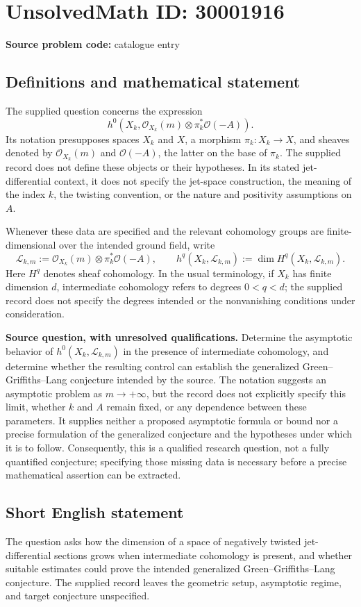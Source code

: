 \documentclass[11pt]{article}
\begin{document}
\section*{UnsolvedMath ID: 30001916}
\textbf{Source problem code:} catalogue entry
\subsection{Definitions and mathematical statement}
The supplied question concerns the expression
\[
h^0\!\left(X_k,\mathcal O_{X_k}(m)\otimes\pi_k^*\mathcal O(-A)\right).
\]
Its notation presupposes spaces \(X_k\) and \(X\), a morphism \(\pi_k:X_k\to X\), and sheaves denoted by \(\mathcal O_{X_k}(m)\) and \(\mathcal O(-A)\), the latter on the base of \(\pi_k\). The supplied record does not define these objects or their hypotheses. In its stated jet-differential context, it does not specify the jet-space construction, the meaning of the index \(k\), the twisting convention, or the nature and positivity assumptions on \(A\).

Whenever these data are specified and the relevant cohomology groups are finite-dimensional over the intended ground field, write
\[
\mathcal L_{k,m}:=\mathcal O_{X_k}(m)\otimes\pi_k^*\mathcal O(-A),
\qquad
h^q(X_k,\mathcal L_{k,m}):=\dim H^q(X_k,\mathcal L_{k,m}).
\]
Here \(H^q\) denotes sheaf cohomology. In the usual terminology, if \(X_k\) has finite dimension \(d\), intermediate cohomology refers to degrees \(0<q<d\); the supplied record does not specify the degrees intended or the nonvanishing conditions under consideration.

\textbf{Source question, with unresolved qualifications.} Determine the asymptotic behavior of \(h^0(X_k,\mathcal L_{k,m})\) in the presence of intermediate cohomology, and determine whether the resulting control can establish the generalized Green--Griffiths--Lang conjecture intended by the source. The notation suggests an asymptotic problem as \(m\to+\infty\), but the record does not explicitly specify this limit, whether \(k\) and \(A\) remain fixed, or any dependence between these parameters. It supplies neither a proposed asymptotic formula or bound nor a precise formulation of the generalized conjecture and the hypotheses under which it is to follow. Consequently, this is a qualified research question, not a fully quantified conjecture; specifying those missing data is necessary before a precise mathematical assertion can be extracted.
\subsection{Short English statement}
The question asks how the dimension of a space of negatively twisted jet-differential sections grows when intermediate cohomology is present, and whether suitable estimates could prove the intended generalized Green--Griffiths--Lang conjecture. The supplied record leaves the geometric setup, asymptotic regime, and target conjecture unspecified.
\end{document}
